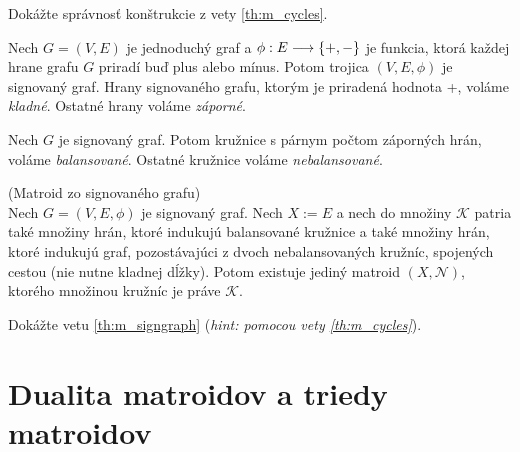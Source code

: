 \begin{exercise}
\label{ex:m_cycles}
Dokážte správnosť konštrukcie z vety \ref{th:m_cycles}.
\end{exercise}

\begin{definition}
Nech $G = (V, E)$ je jednoduchý graf a $\phi:E\longrightarrow\left\{+, -\right\}$ je funkcia, ktorá každej hrane grafu $G$ priradí buď plus alebo mínus. 
Potom trojica $(V, E, \phi)$ je signovaný graf.
Hrany signovaného grafu, ktorým je priradená hodnota +, voláme \emph{kladné}.
Ostatné hrany voláme \emph{záporné}.
\end{definition}

\begin{definition}
Nech $G$ je signovaný graf.
Potom kružnice s párnym počtom záporných hrán, voláme \emph{balansované}. Ostatné kružnice voláme \emph{nebalansované}.
\end{definition}

\begin{theorem}{(Matroid zo signovaného grafu)}\\
\label{th:m_signgraph}
Nech $G = (V,E,\phi)$ je signovaný graf.
Nech $X := E$ a nech do množiny $\mathcal{K}$ patria také množiny hrán, ktoré indukujú balansované kružnice a také množiny hrán, ktoré indukujú graf, pozostávajúci z dvoch nebalansovaných kružníc, spojených cestou (nie nutne kladnej dĺžky).
Potom existuje jediný matroid $(X, \mathcal{N})$, ktorého množinou kružníc je práve $\mathcal{K}$. 
\end{theorem}
\begin{exercise}
Dokážte vetu \ref{th:m_signgraph} (\emph{hint: pomocou vety \ref{th:m_cycles}}).
\end{exercise}

\section{Dualita matroidov a triedy matroidov}

